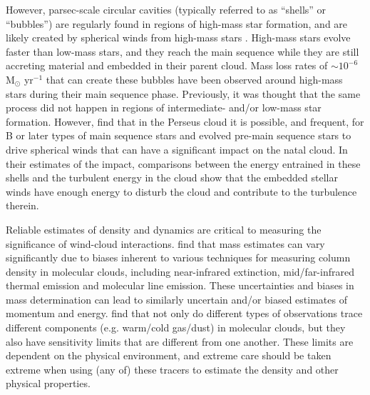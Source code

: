 \documentclass[11pt,a4paper]{emulateapj}
\begin{document}
However, parsec-scale circular cavities (typically referred to as ``shells'' or ``bubbles'') are regularly found in regions of high-mass star formation, and are likely created by spherical winds from high-mass stars \citep{Churchwell_2006,Churchwell_2007,Beaumont_2010}. High-mass stars evolve faster than low-mass stars, and they reach the main sequence while they are still accreting material and embedded in their parent cloud. Mass loss rates of $\sim$$10^{-6}$ M$_{\odot}$ yr$^{-1}$ that can create these bubbles have been observed around high-mass stars during their main sequence phase. Previously, it was thought that the same process did not happen in regions of intermediate- and/or low-mass star formation. However, \citet{Arce_2011} find that in the Perseus cloud it is possible, and frequent, for B or later types of main sequence stars and evolved pre-main sequence stars to drive spherical winds that can have a significant impact on the natal cloud. In their estimates of the impact, comparisons between the energy entrained in these shells and the turbulent energy in the cloud show that the embedded stellar winds have enough energy to disturb the cloud and contribute to the turbulence therein.

Reliable estimates of density and  dynamics are critical to measuring the significance of wind-cloud interactions. \citet{Goodman_2009} find that mass estimates can vary significantly due to biases inherent to various techniques for measuring column density in molecular clouds, including near-infrared extinction, mid/far-infrared thermal emission and molecular line emission.  These uncertainties and biases in mass determination can lead to similarly uncertain and/or biased estimates of momentum and energy.  \citet{Goodman_2009} find that not only do different types of observations trace different components (e.g. warm/cold gas/dust) in molecular clouds, but they also have sensitivity limits that are different from one another. These limits are dependent on the physical environment, and extreme care should be taken extreme when using (any of) these tracers to estimate the density and other physical properties.

\end{document}
